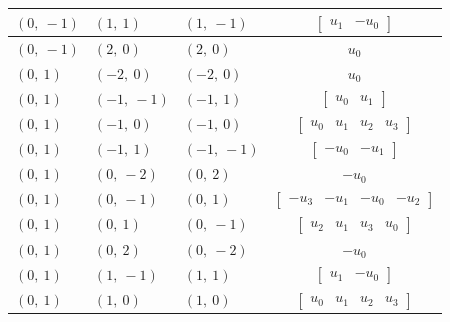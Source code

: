 \documentclass[11pt]{article}
\theoremstyle{definition}
\begin{document}
\begin{longtable}{|l|l|l|c|}
    \hline
    $\left( 0, \  -1\right)$ & $\left( 1, \  1\right)$ & $\left( 1, \  -1\right)$ & $\left[\begin{matrix}u_{1} & - u_{0}\end{matrix}\right]$ \\
    \hline
    $\left( 0, \  -1\right)$ & $\left( 2, \  0\right)$ & $\left( 2, \  0\right)$ & $u_{0}$ \\
    \hline
    $\left( 0, \  1\right)$ & $\left( -2, \  0\right)$ & $\left( -2, \  0\right)$ & $u_{0}$ \\
    \hline
    $\left( 0, \  1\right)$ & $\left( -1, \  -1\right)$ & $\left( -1, \  1\right)$ & $\left[\begin{matrix}u_{0} & u_{1}\end{matrix}\right]$ \\
    \hline
    $\left( 0, \  1\right)$ & $\left( -1, \  0\right)$ & $\left( -1, \  0\right)$ & $\left[\begin{matrix}u_{0} & u_{1} & u_{2} & u_{3}\end{matrix}\right]$ \\
    \hline
    $\left( 0, \  1\right)$ & $\left( -1, \  1\right)$ & $\left( -1, \  -1\right)$ & $\left[\begin{matrix}- u_{0} & - u_{1}\end{matrix}\right]$ \\
    \hline
    $\left( 0, \  1\right)$ & $\left( 0, \  -2\right)$ & $\left( 0, \  2\right)$ & $- u_{0}$ \\
    \hline
    $\left( 0, \  1\right)$ & $\left( 0, \  -1\right)$ & $\left( 0, \  1\right)$ & $\left[\begin{matrix}- u_{3} & - u_{1} & - u_{0} & - u_{2}\end{matrix}\right]$ \\
    \hline
    $\left( 0, \  1\right)$ & $\left( 0, \  1\right)$ & $\left( 0, \  -1\right)$ & $\left[\begin{matrix}u_{2} & u_{1} & u_{3} & u_{0}\end{matrix}\right]$ \\
    \hline
    $\left( 0, \  1\right)$ & $\left( 0, \  2\right)$ & $\left( 0, \  -2\right)$ & $- u_{0}$ \\
    \hline
    $\left( 0, \  1\right)$ & $\left( 1, \  -1\right)$ & $\left( 1, \  1\right)$ & $\left[\begin{matrix}u_{1} & - u_{0}\end{matrix}\right]$ \\
    \hline
    $\left( 0, \  1\right)$ & $\left( 1, \  0\right)$ & $\left( 1, \  0\right)$ & $\left[\begin{matrix}u_{0} & u_{1} & u_{2} & u_{3}\end{matrix}\right]$ \\

\end{longtable}
\end{document}
